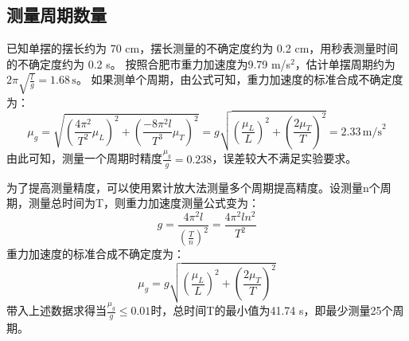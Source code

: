 \documentclass[a4paper]{extarticle}
\begin{document}
    \subsection{测量周期数量}
    \hspace{2em}
    已知单摆的摆长约为 70 cm，摆长测量的不确定度约为 0.2 cm，用秒表测量时间的不确定度约为 0.2 s。
    按照合肥市重力加速度为9.79 m/s$^2$，估计单摆周期约为$2\pi\sqrt{\frac{l}{g}}=1.68\,\text{s}$。
    如果测单个周期，由公式可知，重力加速度的标准合成不确定度为：
    \begin{equation*}
        \mu_g=\sqrt{\left(\frac{4\pi^2}{T^2}\mu_L\right)^2+\left(\frac{-8\pi^2l}{T^3}\mu_T\right)^2}
        =g\sqrt{\left(\frac{\mu_L}{L}\right)^2+\left(\frac{2\mu_T}{T}\right)^2}
        =2.33\,\text{m/s}^2
    \end{equation*}
    由此可知，测量一个周期时精度$\frac{\mu_g}{g}=0.238$，误差较大不满足实验要求。
    \par\hspace{2em}
    为了提高测量精度，可以使用累计放大法测量多个周期提高精度。设测量n个周期，测量总时间为T，则重力加速度测量公式变为：
    \begin{equation*}
        g=\frac{4\pi^2l}{\left(\frac{T}{n}\right)^2}=\frac{4\pi^2ln^2}{T^2}
    \end{equation*}
    重力加速度的标准合成不确定度为：
    \begin{equation*}
        \mu_g=g\sqrt{\left(\frac{\mu_L}{L}\right)^2+\left(\frac{2\mu_T}{T}\right)^2}
    \end{equation*}
    带入上述数据求得当$\frac{\mu_g}{g}\leq0.01$时，总时间T的最小值为41.74 s，即最少测量25个周期。
\end{document}
